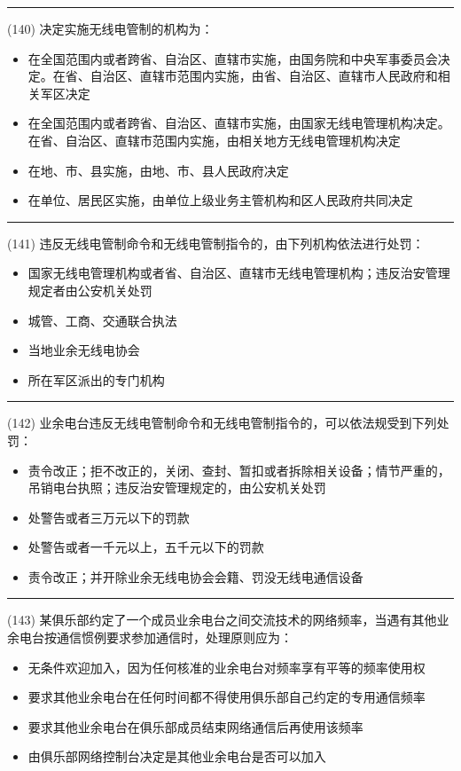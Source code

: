 \documentclass[twocolumn]{ctexart}  %
\begin{document}
\noindent\rule{0.5\textwidth}{1pt}
\heiti (140) 决定实施无线电管制的机构为： \songti {\color{gray} [LK0108] }
\begin{itemize}
	\item  在全国范围内或者跨省、自治区、直辖市实施，由国务院和中央军事委员会决定。在省、自治区、直辖市范围内实施，由省、自治区、直辖市人民政府和相关军区决定
	\item  在全国范围内或者跨省、自治区、直辖市实施，由国家无线电管理机构决定。在省、自治区、直辖市范围内实施，由相关地方无线电管理机构决定
	\item  在地、市、县实施，由地、市、县人民政府决定
	\item  在单位、居民区实施，由单位上级业务主管机构和区人民政府共同决定
\end{itemize}


\noindent\rule{0.5\textwidth}{1pt}
\heiti (141) 违反无线电管制命令和无线电管制指令的，由下列机构依法进行处罚： \songti {\color{gray} [LK0109] }
\begin{itemize}
	\item  国家无线电管理机构或者省、自治区、直辖市无线电管理机构；违反治安管理规定者由公安机关处罚
	\item  城管、工商、交通联合执法
	\item  当地业余无线电协会
	\item  所在军区派出的专门机构
\end{itemize}


\noindent\rule{0.5\textwidth}{1pt}
\heiti (142) 业余电台违反无线电管制命令和无线电管制指令的，可以依法规受到下列处罚： \songti {\color{gray} [LK0110] }
\begin{itemize}
	\item   责令改正；拒不改正的，关闭、查封、暂扣或者拆除相关设备；情节严重的，吊销电台执照；违反治安管理规定的，由公安机关处罚
	\item   处警告或者三万元以下的罚款
	\item   处警告或者一千元以上，五千元以下的罚款 
	\item   责令改正；并开除业余无线电协会会籍、罚没无线电通信设备
\end{itemize}


\noindent\rule{0.5\textwidth}{1pt}
\heiti (143) 某俱乐部约定了一个成员业余电台之间交流技术的网络频率，当遇有其他业余电台按通信惯例要求参加通信时，处理原则应为： \songti {\color{gray} [LK0050] }
\begin{itemize}
	\item  无条件欢迎加入，因为任何核准的业余电台对频率享有平等的频率使用权
	\item  要求其他业余电台在任何时间都不得使用俱乐部自己约定的专用通信频率
	\item  要求其他业余电台在俱乐部成员结束网络通信后再使用该频率
	\item  由俱乐部网络控制台决定是其他业余电台是否可以加入
\end{itemize}
\end{document}
